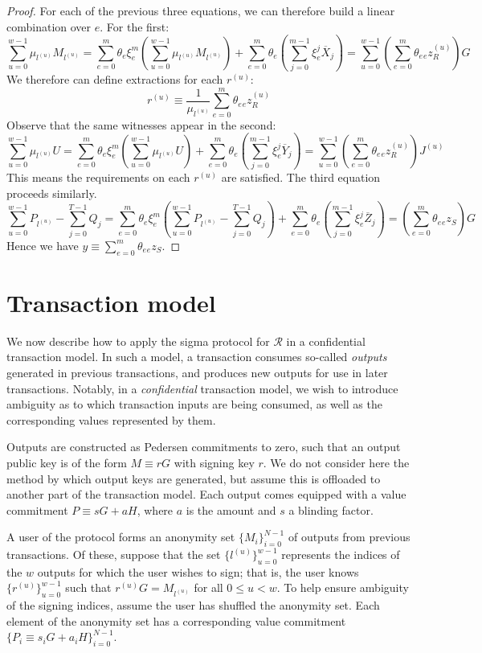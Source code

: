 \documentclass{article}
\newcommand{\sumj}{\sum_{j=0}^{m-1}}
\newcommand{\sumu}{\sum_{u=0}^{w-1}}
\theoremstyle{definition}
\begin{document}
\begin{proof}
For each of the previous three equations, we can therefore build a linear combination over $e$. For the first:
$$\sumu \mu_{l^{(u)}} M_{l^{(u)}} = \sum_{e=0}^m \theta_e\xi_e^m \left( \sumu \mu_{l^{(u)}} M_{l^{(u)}} \right) + \sum_{e=0}^m \theta_e \left( \sumj \xi_e^j \overline{X}_j \right) = \sumu \left( \sum_{e=0}^m \theta_e {}_ez^{(u)}_R \right) G$$
We therefore can define extractions for each $r^{(u)}$:
$$r^{(u)} \equiv \frac{1}{\mu_{l^{(u)}}} \sum_{e=0}^m \theta_e {}_ez^{(u)}_R$$
Observe that the same witnesses appear in the second:
$$\sumu \mu_{l^{(u)}} U = \sum_{e=0}^m \theta_e\xi_e^m \left( \sumu \mu_{l^{(u)}} U \right) + \sum_{e=0}^m \theta_e \left( \sumj \xi_e^j \overline{Y}_j \right) = \sumu \left( \sum_{e=0}^m \theta_e {}_ez^{(u)}_R \right) J^{(u)}$$
This means the requirements on each $r^{(u)}$ are satisfied. The third equation proceeds similarly.
$$\sumu P_{l^{(u)}} - \sum_{j=0}^{T-1} Q_j = \sum_{e=0}^m \theta_e\xi_e^m \left( \sumu P_{l^{(u)}} - \sum_{j=0}^{T-1} Q_j \right) + \sum_{e=0}^m \theta_e \left( \sumj \xi_e^j \overline{Z}_j \right) = \left( \sum_{e=0}^m \theta_e {}_ez_S  \right)G$$
Hence we have $y \equiv \sum_{e=0}^m \theta_e {}_ez_S$.
\end{proof}


\section{Transaction model}
We now describe how to apply the sigma protocol for $\mathcal{R}$ in a confidential transaction model.
In such a model, a transaction consumes so-called \textit{outputs} generated in previous transactions, and produces new outputs for use in later transactions.
Notably, in a \textit{confidential} transaction model, we wish to introduce ambiguity as to which transaction inputs are being consumed, as well as the corresponding values represented by them.

Outputs are constructed as Pedersen commitments to zero, such that an output public key is of the form $M \equiv rG$ with signing key $r$.
We do not consider here the method by which output keys are generated, but assume this is offloaded to another part of the transaction model.
Each output comes equipped with a value commitment $P \equiv sG + aH$, where $a$ is the amount and $s$ a blinding factor.

A user of the protocol forms an anonymity set $\{M_i\}_{i=0}^{N-1}$ of outputs from previous transactions.
Of these, suppose that the set $\{l^{(u)}\}_{u=0}^{w-1}$ represents the indices of the $w$ outputs for which the user wishes to sign; that is, the user knows $\{r^{(u)}\}_{u=0}^{w-1}$ such that $r^{(u)}G = M_{l^{(u)}}$ for all $0 \leq u < w$.
To help ensure ambiguity of the signing indices, assume the user has shuffled the anonymity set.
Each element of the anonymity set has a corresponding value commitment $\{P_i \equiv s_iG + a_iH\}_{i=0}^{N-1}$.
\end{document}
